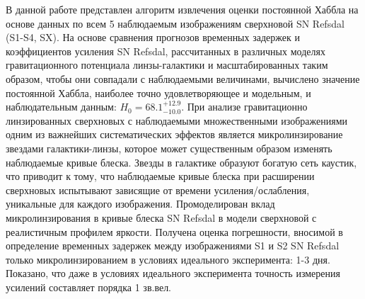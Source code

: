 В данной работе представлен алгоритм извлечения оценки постоянной Хаббла на основе данных по всем 5 наблюдаемым изображениям сверхновой SN Refsdal (S1-S4, SX). На основе сравнения прогнозов временных задержек и коэффициентов усиления SN Refsdal, рассчитанных в различных моделях гравитационного потенциала линзы-галактики и масштабированных таким образом, чтобы они совпадали с наблюдаемыми величинами, вычислено значение постоянной Хаббла, наиболее точно удовлетворяющее и модельным, и наблюдательным данным: $H_0=68.1_{-10.0}^{+12.9}$. При анализе гравитационно линзированных сверхновых с наблюдаемыми множественными изображениями одним из важнейших систематических эффектов является микролинзирование звездами галактики-линзы, которое может существенным образом изменять наблюдаемые кривые блеска. Звезды в галактике образуют богатую сеть каустик, что приводит к тому, что наблюдаемые кривые блеска при расширении сверхновых испытывают зависящие от времени усиления/ослабления, уникальные для каждого изображения. Промоделирован вклад микролинзирования в кривые блеска SN Refsdal в модели сверхновой с реалистичным профилем яркости. Получена оценка погрешности, вносимой в определение временных задержек между изображениями S1 и S2 SN Refsdal только микролинзированием в условиях идеального эксперимента: 1-3 дня. Показано, что даже в условиях идеального эксперимента точность измерения усилений составляет порядка 1 зв.вел. 

